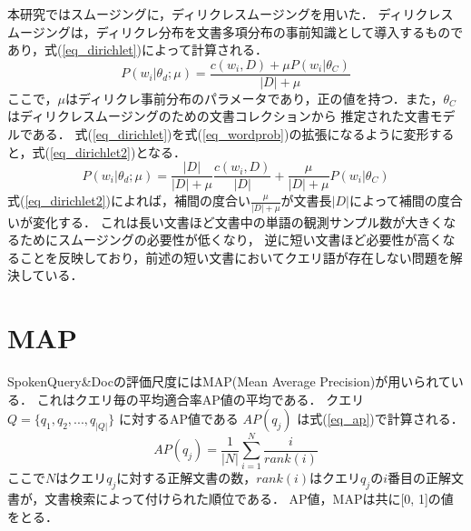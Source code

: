 本研究ではスムージングに，ディリクレスムージング\cite{smoothing2}を用いた．
ディリクレスムージングは，ディリクレ分布を文書多項分布の事前知識として導入するものであり，式(\ref{eq_dirichlet})によって計算される．
\begin{equation}
    P(w_i|\theta_d;\mu) = \frac{ c(w_i, D) + \mu P(w_i|\theta_C) }{ |D| + \mu } \label{eq_dirichlet}
\end{equation}
ここで，$\mu$はディリクレ事前分布のパラメータであり，正の値を持つ．また，$\theta_C$はディリクレスムージングのための文書コレクションから
推定された文書モデルである．
式(\ref{eq_dirichlet})を式(\ref{eq_wordprob})の拡張になるように変形すると，式(\ref{eq_dirichlet2})となる．
\begin{equation}
    P(w_i|\theta_d;\mu) = \frac{|D|}{|D|+\mu} \frac{c(w_i, D)}{|D|} + \frac{\mu}{|D|+\mu}P(w_i|\theta_C)  \label{eq_dirichlet2}
\end{equation}
式(\ref{eq_dirichlet2})によれば，補間の度合い$\frac{\mu}{|D|+\mu}$が文書長$|D|$によって補間の度合いが変化する．
これは長い文書ほど文書中の単語の観測サンプル数が大きくなるためにスムージングの必要性が低くなり，
逆に短い文書ほど必要性が高くなることを反映しており，前述の短い文書においてクエリ語が存在しない問題を解決している．

\section{MAP} \label{sec_map}
SpokenQuery\&Docの評価尺度にはMAP(Mean Average Precision)が用いられている．
これはクエリ毎の平均適合率AP値の平均である．
クエリ $Q = \{q_1, q_2, ..., q_{|Q|}\}$ に対するAP値である $AP(q_j)$ は式(\ref{eq_ap})で計算される．
\begin{equation}
    AP(q_j) = \frac{1}{|N|} \sum^N_{i=1} \frac{i}{rank(i)}    \label{eq_ap}
\end{equation}
ここで$N$はクエリ$q_j$に対する正解文書の数，$rank(i)$はクエリ$q_j$の$i$番目の正解文書が，文書検索によって付けられた順位である．
AP値，MAPは共に[0, 1]の値をとる．
